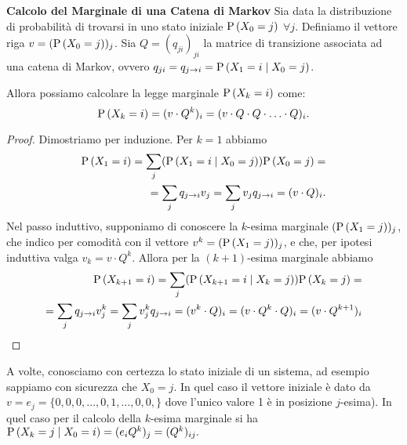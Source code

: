 \begin{prop}\textbf{Calcolo del Marginale di una Catena di Markov}
Sia data la distribuzione di probabilit\`a di trovarsi in uno stato iniziale $ \text{P}\left(X_0 = j\right)$ $\forall j $. 
Definiamo il vettore riga $ v = (\text{P}\left(X_0 = j\right))_j $. Sia $ Q=(q_{ji})_{ji} $ la matrice di transizione associata 
ad una catena di Markov, ovvero $ q_{ji} =q_{j \to i}= \text{P}\left(X_1 = i \mid X_0 = j\right) $. 

Allora possiamo calcolare la legge marginale  $ \text{P}\left(X_k = i\right) $ come:
 $$ \text{P}\left(X_k = i\right) = (v \cdot Q^k)_i = (v \cdot  Q \cdot Q \cdot \hdots \cdot Q)_i.$$
 \end{prop}
 \begin{proof}
Dimostriamo  per induzione. Per $k=1$ abbiamo
\begin{equation*}
	\begin{aligned}
	\text{P}\left(X_1 = i\right) =  \sum_j (\text{P}\left(X_1 = i \mid X_0 = j\right)) \text{P}\left( X_0 = j\right)= \\
	 = \sum_j q_{j \to i} v_j = \sum_j v_j q_{j \to i} = (v \cdot Q)_i.
	\end{aligned}
\end{equation*}
Nel passo induttivo, supponiamo di conoscere la $k$-esima marginale $(\text{P}\left(X_1 = j\right) )_j$, che indico 
per comodit\`a con il vettore $v^k=(\text{P}\left(X_1 = j\right) )_j$, e che, per ipotesi induttiva valga $v_k=v\cdot Q^k$.
Allora per la $(k+1)$-esima marginale abbiamo
\begin{equation*}
	\begin{aligned}
	\text{P}\left(X_{k+1} = i\right) =  \sum_j (\text{P}\left(X_{k+1} = i \mid X_{k}= j\right)) \text{P}\left( X_{k} = j\right)= \\
	 = \sum_j q_{j \to i} v^k_j = \sum_j v^k_j q_{j \to i} = (v^k \cdot Q)_i=(v\cdot Q^k \cdot Q)_i=
	  (v\cdot Q^{k+1} )_i
	\end{aligned}
\end{equation*}

\end{proof} 

A volte, conosciamo con certezza lo stato iniziale di un sistema, ad esempio sappiamo con sicurezza 
che $ X_0 = j$. In quel caso il vettore iniziale \`e dato da $v =  e_j =\{0, 0, 0, \hdots, 0, 1, \hdots, 0, 0,\} $  
dove l'unico valore 1 \`e  in posizione $j$-esima). In quel caso per il calcolo della $k$-esima marginale si ha
$
\text{P}\left(X_k = j \mid X_0 = i\right)=(e_i Q^k)_j = (Q^k)_{ij}. 
$

